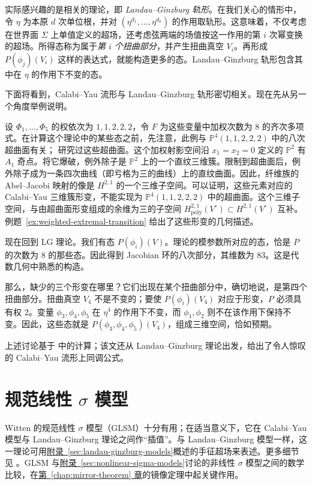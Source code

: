 实际感兴趣的是相关的理论，即 \emph{Landau--Ginzburg 轨形}。在我们关心的情形中，令 $\eta$ 为本原 $d$ 次单位根，并对 $(\eta^{d_1},\ldots,\eta^{d_k})$ 的作用取轨形。这意味着，不仅考虑在世界面 $\Sigma$ 上单值定义的超场，还考虑弦两端的场值按这一作用的第 $i$ 次幂变换的超场。所得态称为属于\emph{第 $i$ 个扭曲部分}，并产生扭曲真空 $V_i$。再形成 $P(\phi_j)(V_i)$ 这样的表达式，就能构造更多的态。Landau--Ginzburg 轨形包含其中在 $\eta$ 的作用下不变的态。

下面将看到，Calabi--Yau 流形与 Landau--Ginzburg 轨形密切相关。现在先从另一个角度举例说明。
\begin{example}\label{ex:lg-octic-twisted-sector}
设 $\Phi_1,\ldots,\Phi_5$ 的权依次为 $1,1,2,2,2$，令 $F$ 为这些变量中加权次数为 $8$ 的齐次多项式。在计算这个理论中的某些态之前，先注意，此例与 $\mathbb P^4(1,1,2,2,2)$ 中的八次超曲面有关； 研究过这些超曲面。这个加权射影空间沿 $x_1=x_2=0$ 定义的 $\mathbb P^2$ 有 $A_1$ 奇点。将它爆破，例外除子是 $\mathbb P^2$ 上的一个直纹三维簇。限制到超曲面后，例外除子成为一条四次曲线（即亏格为三的曲线）上的直纹曲面。因此，纤维族的 Abel--Jacobi 映射的像是 $H^{2,1}$ 的一个三维子空间。可以证明，这些元素对应的 Calabi--Yau 三维簇形变，不能实现为 $\mathbb P^4(1,1,2,2,2)$ 中的超曲面。这个三维子空间，与由超曲面形变组成的余维为三的子空间 $H^{2,1}_{\mathrm{poly}}(V^\circ)\subset H^{2,1}(V^\circ)$ 互补。例题~\ref{ex:weighted-extremal-transition} 给出了这些形变的几何描述。

现在回到 LG 理论。我们有态 $P(\phi_i)(V)$。理论的模参数所对应的态，恰是 $P$ 的次数为 $8$ 的那些态。因此得到 Jacobian 环的八次部分，其维数为 $83$。这是代数几何中熟悉的构造。

那么，缺少的三个形变在哪里？它们出现在某个扭曲部分中，确切地说，是第四个扭曲部分。扭曲真空 $V_4$ 不是不变的；要使 $P(\phi_i)(V_4)$ 对应于形变，$P$ 必须具有权 $2$。变量 $\phi_3,\phi_4,\phi_5$ 在 $\eta^4$ 的作用下不变，而 $\phi_1,\phi_2$ 则不在该作用下保持不变。因此，这些态就是 $P(\phi_3,\phi_4,\phi_5)(V_4)$，组成三维空间，恰如预期。
\end{example}
上述讨论基于  中的计算；该文还从 Landau--Ginzburg 理论出发，给出了令人惊叹的 Calabi--Yau 流形上同调公式。

\section{规范线性 \texorpdfstring{$\sigma$}{σ} 模型}\label{sec:gauged-linear-sigma-models}
Witten 的规范线性 $\sigma$ 模型（GLSM）十分有用；在适当意义下，它在 Calabi--Yau 模型与 Landau--Ginzburg 理论之间作“插值”。与 Landau--Ginzburg 模型一样，这一理论可用\hyperref[sec:landau-ginzburg-models]{附录~\ref*{sec:landau-ginzburg-models}}概述的手征超场来表述。更多细节见 。GLSM 与\hyperref[sec:nonlinear-sigma-models]{附录~\ref*{sec:nonlinear-sigma-models}}讨论的非线性 $\sigma$ 模型之间的数学比较，在\hyperref[chap:mirror-theorem]{第~\ref*{chap:mirror-theorem} 章}的镜像定理中起关键作用。

